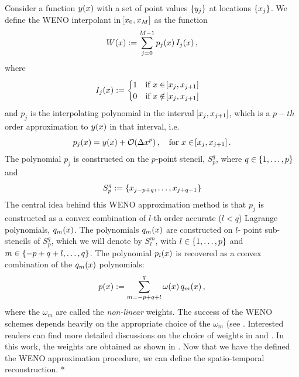 \documentclass[final]{amsart}
\numberwithin{equation}{section}
\begin{document}
Consider a function $y\!\left({x}\right)$ with a set of point values $\left\lbrace y_j\right\rbrace$ at locations $\left\lbrace x_j\right\rbrace$.  We define the WENO interpolant in $\!\left[{x_0, x_M}\right]$ as the function
\begin{equation}\label{eq:WENO_interp}
W\!\left({x}\right):= \sum_{j=0}^{M-1}p_j\!\left({x}\right)I_j\!\left({x}\right),
\end{equation}
where
\begin{equation}\label{eq:ind_function}
I_j\!\left({x}\right):=\begin{cases}
1\quad \text{if } x \in \!\left[{x_j, x_{j+1}}\right]\\
0 \quad \text{if } x \notin \!\left[{x_j, x_{j+1}}\right]\\
\end{cases}
\end{equation}
and $p_j$ is the interpolating polynomial in the interval $\!\left[{x_j,x_{j+1}}\right]$, which is a $p-th$ order approximation to $y\!\left({x}\right)$ in that interval, i.e.
\begin{equation}
p_j\!\left({x}\right) = y\!\left({x}\right) + \mathcal{O}\!\left({\Delta x^p}\right), \quad \text{for } x\in \!\left[{x_j, x_{j+1}}\right].
\end{equation}
The polynomial $p_j$ is constructed on the $p$-point stencil, $S^q_p$, where $q\in\left\lbrace1,\dots,p\right\rbrace$ and
\begin{equation}
S^q_p:=\left\lbrace x_{j-p+q},\dots,x_{j+q-1}\right\rbrace
\end{equation}
The central idea behind this WENO approximation method is that $p_j$ is constructed  as a convex combination of $l$-th order  accurate ($l<q$) Lagrange polynomials, $q_m\!\left({x}\right)$.  The polynomials $q_m\!\left({x}\right)$ are constructed on $l$- point sub-stencils of $S^q_p$, which we will denote by $S^m_l$, with $l\in\left\lbrace1,\dots,p\right\rbrace$ and $m\in\left\lbrace-p+q+l,\dots,q\right\rbrace$.  The polynomial $p_i\!\left({x}\right)$ is recovered as a convex combination of the $q_m\!\left({x}\right)$ polynomials:
\begin{equation}
p\!\left({x}\right):=\sum_{m=-p+q+l}^q\omega\!\left({x}\right)q_m\!\left({x}\right),
\end{equation}
 where the $\omega_m$ are called the \textit{non-linear} weights.  The success of the WENO schemes depends heavily on the appropriate choice of the $\omega_m$ (see \cite{shu1998essentially}. Interested readers can find more detailed discussions on the choice of weights in \cite{carlini2005weighted} and \cite{liu2009positivity}.  In this work, the weights are obtained as shown in \cite[\S3]{janett2019novel}.   Now that we have the defined the WENO approximation procedure, we can define the spatio-temporal reconstruction. 
 \/*
\end{document}
